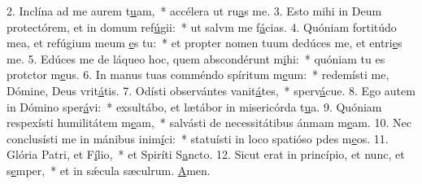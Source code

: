 2. Inclína ad me aurem t\uline{u}am,~* accélera ut ru\uline{a}s me.
3. Esto mihi in Deum protectórem, et in domum ref\uline{ú}gii:~* ut salvm me f\uline{á}cias.
4. Quóniam fortitúdo mea, et refúgium meum \uline{e}s tu:~* et propter nomen tuum dedúces me, et entri\uline{e}s me.
5. Edúces me de láqueo hoc, quem abscondérunt m\uline{i}hi:~* quóniam tu es protctor m\uline{e}us.
6. In manus tuas comméndo spíritum m\uline{e}um:~* redemísti me, Dómine, Deus vrit\uline{á}tis.
7. Odísti observántes vanit\uline{á}tes,~* sperv\uline{á}cue.
8. Ego autem in Dómino sper\uline{á}vi:~* exsultábo, et lætábor in misericórda t\uline{u}a.
9. Quóniam respexísti humilitátem m\uline{e}am,~* salvásti de necessitátibus ánmam m\uline{e}am.
10. Nec conclusísti me in mánibus inim\uline{í}ci:~* statuísti in loco spatióso pdes m\uline{e}os.
11. Glória Patri, et F\uline{í}lio,~* et Spiríti S\uline{a}ncto.
12. Sicut erat in princípio, et nunc, et s\uline{e}mper,~* et in sǽcula sæculrum. \uline{A}men.
